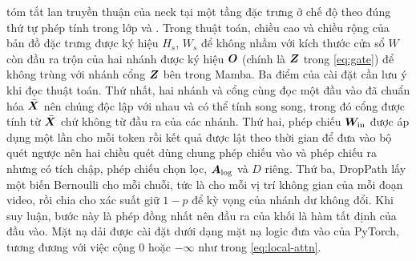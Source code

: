  tóm tắt lan truyền thuận của neck tại một tầng đặc trưng ở chế độ  theo đúng thứ tự phép tính trong lớp  và . Trong thuật toán, chiều cao và chiều rộng của bản đồ đặc trưng được ký hiệu $H_s$, $W_s$ để không nhầm với kích thước cửa sổ $W$ còn đầu ra trộn của hai nhánh được ký hiệu $\bm{O}$ (chính là $\bm{Z}$ trong \cref{eq:gate}) để không trùng với nhánh cổng $\bm{Z}$ bên trong Mamba. Ba điểm của cài đặt cần lưu ý khi đọc thuật toán. Thứ nhất, hai nhánh và cổng cùng đọc một đầu vào đã chuẩn hóa $\bar{\bm{X}}$ nên chúng độc lập với nhau và có thể tính song song, trong đó cổng được tính từ $\bar{\bm{X}}$ chứ không từ đầu ra của các nhánh. Thứ hai, phép chiếu $\bm{W}_{\text{in}}$ được áp dụng một lần cho mỗi token rồi kết quả được lật theo thời gian để đưa vào bộ quét ngược nên hai chiều quét dùng chung phép chiếu vào và phép chiếu ra nhưng có tích chập, phép chiếu chọn lọc, $\bm{A}_{\log}$ và $D$ riêng. Thứ ba, DropPath lấy một biến Bernoulli cho mỗi chuỗi, tức là cho mỗi vị trí không gian của mỗi đoạn video, rồi chia cho xác suất giữ $1-p$ để kỳ vọng của nhánh dư không đổi. Khi suy luận, bước này là phép đồng nhất nên đầu ra của khối là hàm tất định của đầu vào. Mặt nạ dải được cài đặt dưới dạng mặt nạ logic đưa vào  của PyTorch, tương đương với việc cộng $0$ hoặc $-\infty$ như trong \cref{eq:local-attn}.

